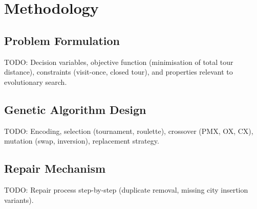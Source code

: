 \chapter{Methodology}
\label{Chapter3}

\section{Problem Formulation}
\label{Sec:Formulation}
TODO: Decision variables, objective function (minimisation of total tour distance), constraints (visit-once, closed tour), and properties relevant to evolutionary search.

\section{Genetic Algorithm Design}
\label{Sec:GADesign}
TODO: Encoding, selection (tournament, roulette), crossover (PMX, OX, CX), mutation (swap, inversion), replacement strategy.

\section{Repair Mechanism}
\label{Sec:RepairDesign}
TODO: Repair process step-by-step (duplicate removal, missing city insertion variants).
